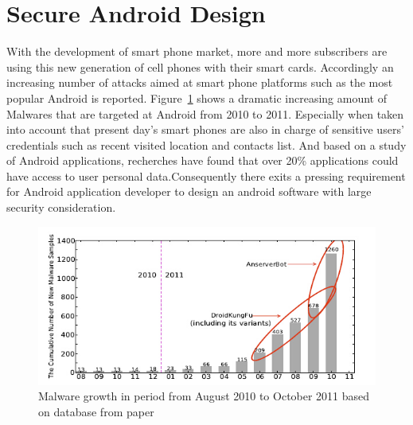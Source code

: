 \section{Secure Android Design}
With the development of smart phone market, more and more subscribers are using this new generation of cell phones with their smart cards. Accordingly an increasing number of attacks aimed at smart phone platforms such as the most popular Android is reported. Figure~\ref{fig:android-malware} shows a dramatic increasing amount of Malwares that are targeted at Android from 2010 to 2011\cite{android_malware}. Especially when taken into account that present day's smart phones are also in charge of sensitive users' credentials such as recent visited location and contacts list.  And based on a study of Android applications, recherches have found that over 20\% applications could have access to user personal data\cite{android_secure_design}.Consequently there exits a pressing requirement for Android application developer to design an android software with large security consideration. 
 \begin{figure}[!htbp]
	\centering
	\includegraphics[width=1.0\textwidth]{android-malware.jpg}
		\caption{Malware growth in period from August 2010 to October 2011 based on database from paper\cite{android_malware}}
	\label{fig:android-malware}
\end{figure}
